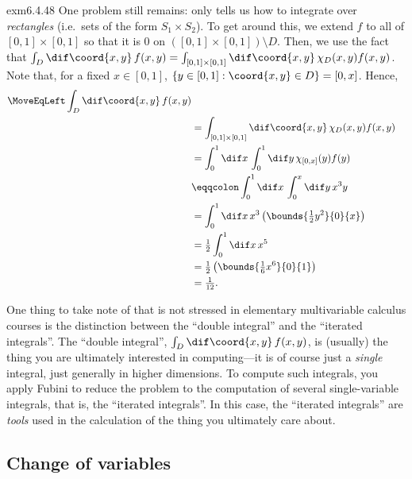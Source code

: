 \begin{exm}{}{exm6.4.48}
One problem still remains:   only tells us how to integrate over \emph{rectangles} (i.e.~sets of the form $S_1\times S_2$).  To get around this, we extend $f$ to all of $[0,1]\times [0,1]$ so that it is $0$ on $([0,1]\times [0,1])\setminus D$.  Then, we use the fact that $\int _D\dif \coord{x,y}\, f(x,y)=\int _{[0,1]\times [0,1]}\dif \coord{x,y}\, \chi _D(x,y)f(x,y)$.  Note that, for a fixed $x\in [0,1]$, $\left\{ y\in [0,1]:\coord{x,y}\in D\right\} =[0,x]$.  Hence,
\begin{equation}
\begin{split}
\MoveEqLeft
\int _D\dif \coord{x,y}\, f(x,y) \\
& =\int _{[0,1]\times [0,1]}\dif \coord{x,y}\, \chi _D(x,y)f(x,y) \\
& =\int _0^1\dif x\, \int _0^1\dif y\, \chi _{[0,x]}(y)f(y) \\
& \eqqcolon \int _0^1\dif x\, \int _0^x\dif y\, x^3y \\
& =\int _0^1\dif x\, x^3\left( \bounds{\tfrac{1}{2}y^2}{0}{x}\right) \\
& =\tfrac{1}{2}\int _0^1\dif x\, x^5 \\
& =\tfrac{1}{2}\left( \bounds{\tfrac{1}{6}x^6}{0}{1}\right) \\
& =\tfrac{1}{12}.
\end{split}
\end{equation}
\begin{rmk}
One thing to take note of that is not stressed in elementary multivariable calculus courses is the distinction between the ``double integral'' and the ``iterated integrals''.  The ``double integral'', $\int _D\dif \coord{x,y}\, f(x,y)$, is (usually) the thing you are ultimately interested in computing---it is of course just a \emph{single} integral, just generally in higher dimensions.  To compute such integrals, you apply Fubini to reduce the problem to the computation of several single-variable integrals, that is, the ``iterated integrals''.  In this case, the ``iterated integrals'' are \emph{tools} used in the calculation of the thing you ultimately care about.
\end{rmk}
\end{exm}

\subsection{Change of variables}

